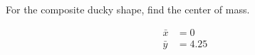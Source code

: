 For the composite ducky shape, find the center of mass.

\begin{solution}
\begin{align*}
    \bar{x} &= 0 \\
    \bar{y} &= 4.25
\end{align*}
\end{solution}